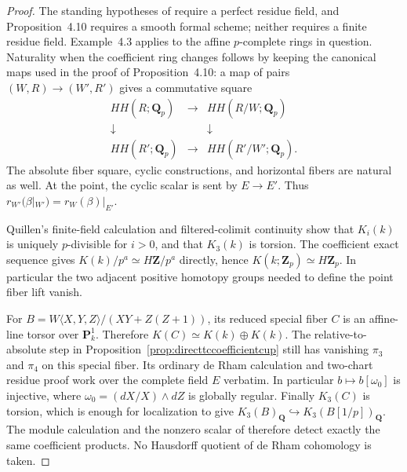 \documentclass[11pt,a4paper]{article}
\theoremstyle{remark}
\begin{document}
\begin{proof}
The standing hypotheses of \cite[Section~4.1]{AMMN} require a perfect
residue field, and Proposition~4.10 requires a smooth formal scheme;
neither requires a finite residue field. Example~4.3 applies to the
affine $p$-complete rings in question. Naturality when the coefficient
ring changes follows by keeping the canonical maps used in the proof
of Proposition~4.10: a map of pairs $(W,R)\to(W',R')$ gives a
commutative square
\[
\begin{matrix}
 HH(R;\mathbf Q_p)&\longrightarrow&HH(R/W;\mathbf Q_p)\\
 \downarrow&&\downarrow\\
 HH(R';\mathbf Q_p)&\longrightarrow&HH(R'/W';\mathbf Q_p).
\end{matrix}
\]
The absolute fiber square, cyclic constructions, and horizontal
fibers are natural as well. At the point, the cyclic scalar is sent
by $E\to E'$. Thus $r_{W'}(\beta|_{W'})=r_W(\beta)|_{E'}$.

Quillen's finite-field calculation and filtered-colimit continuity
show that $K_i(k)$ is uniquely $p$-divisible for $i>0$, and that
$K_3(k)$ is torsion. The coefficient exact sequence gives
$K(k)/p^a\simeq H\mathbf Z/p^a$ directly, hence
$K(k;\mathbf Z_p)\simeq H\mathbf Z_p$. In particular the two adjacent
positive homotopy groups needed to define the point fiber lift vanish.

For $B=W\langle X,Y,Z\rangle/(XY+Z(Z+1))$, its reduced special fiber
$C$ is an affine-line torsor over $\mathbf P^1_k$. Therefore
$K(C)\simeq K(k)\oplus K(k)$. The relative-to-absolute step in
Proposition~\ref{prop:directtccoefficientcup} still has vanishing
$\pi_3$ and $\pi_4$ on this special fiber. Its ordinary de Rham
calculation and two-chart residue proof work over the complete field
$E$ verbatim. In particular $b\mapsto b[\omega_0]$ is injective,
where $\omega_0=(dX/X)\wedge dZ$ is globally regular. Finally
$K_3(C)$ is torsion, which is enough for localization to give
$K_3(B)_{\mathbf Q}\hookrightarrow K_3(B[1/p])_{\mathbf Q}$.
The module calculation and the nonzero scalar of
\cite[Proposition~4.12]{AMMN} therefore detect exactly the same
coefficient products. No Hausdorff quotient of de Rham cohomology
is taken.
\end{proof}
\end{document}
